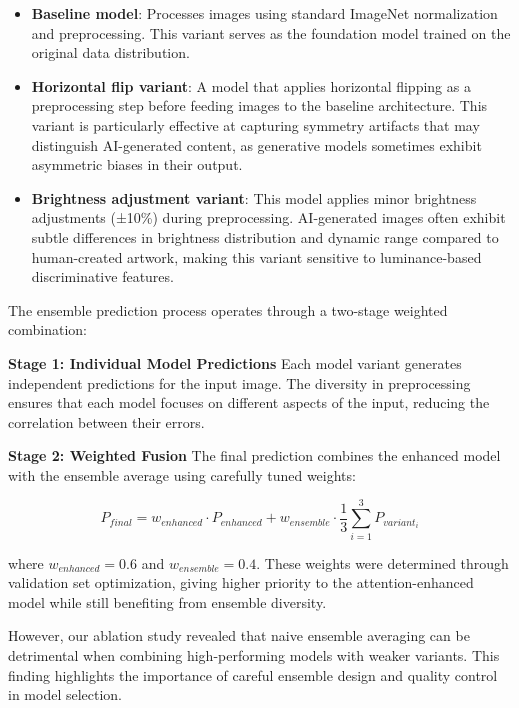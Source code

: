 \documentclass{article}
\begin{document}
\begin{itemize}
    \item \textbf{Baseline model}: Processes images using standard ImageNet normalization and preprocessing. This variant serves as the foundation model trained on the original data distribution.
    
    \item \textbf{Horizontal flip variant}: A model that applies horizontal flipping as a preprocessing step before feeding images to the baseline architecture. This variant is particularly effective at capturing symmetry artifacts that may distinguish AI-generated content, as generative models sometimes exhibit asymmetric biases in their output.
    
    \item \textbf{Brightness adjustment variant}: This model applies minor brightness adjustments (±10\%) during preprocessing. AI-generated images often exhibit subtle differences in brightness distribution and dynamic range compared to human-created artwork, making this variant sensitive to luminance-based discriminative features.
\end{itemize}

The ensemble prediction process operates through a two-stage weighted combination:

\textbf{Stage 1: Individual Model Predictions}
Each model variant generates independent predictions for the input image. The diversity in preprocessing ensures that each model focuses on different aspects of the input, reducing the correlation between their errors.

\textbf{Stage 2: Weighted Fusion}
The final prediction combines the enhanced model with the ensemble average using carefully tuned weights:

\begin{equation}
    P_{final} = w_{enhanced} \cdot P_{enhanced} + w_{ensemble} \cdot \frac{1}{3}\sum_{i=1}^{3} P_{variant_i}
\end{equation}

where $w_{enhanced} = 0.6$ and $w_{ensemble} = 0.4$. These weights were determined through validation set optimization, giving higher priority to the attention-enhanced model while still benefiting from ensemble diversity.

However, our ablation study revealed that naive ensemble averaging can be detrimental when combining high-performing models with weaker variants. This finding highlights the importance of careful ensemble design and quality control in model selection.
\end{document}
